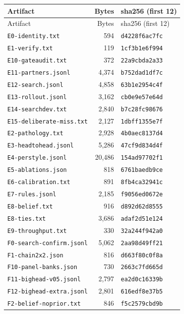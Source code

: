 \begin{longtable}{lrl}
\toprule
Artifact & Bytes & sha256 (first 12) \\
\midrule
\endfirsthead
\toprule
Artifact & Bytes & sha256 (first 12) \\
\midrule
\endhead
\texttt{E0-identity.txt} & 594 & \texttt{d4228f6ac7fc} \\
\texttt{E1-verify.txt} & 119 & \texttt{1cf3b1e6f994} \\
\texttt{E10-gateaudit.txt} & 372 & \texttt{22a9cbda2a33} \\
\texttt{E11-partners.jsonl} & 4,374 & \texttt{b752dad1df7c} \\
\texttt{E12-search.jsonl} & 4,858 & \texttt{63b1e2954c4f} \\
\texttt{E13-rollout.jsonl} & 3,162 & \texttt{cb0e9e57e64d} \\
\texttt{E14-searchdev.txt} & 2,840 & \texttt{b7c28fc98676} \\
\texttt{E15-deliberate-miss.txt} & 2,127 & \texttt{1dbff1355e7f} \\
\texttt{E2-pathology.txt} & 2,928 & \texttt{4b0aec8137d4} \\
\texttt{E3-headtohead.jsonl} & 5,286 & \texttt{47cf9d834d4f} \\
\texttt{E4-perstyle.jsonl} & 20,486 & \texttt{154ad97702f1} \\
\texttt{E5-ablations.json} & 818 & \texttt{6761baedb9ce} \\
\texttt{E6-calibration.txt} & 891 & \texttt{8fb4ca32941c} \\
\texttt{E7-rules.jsonl} & 2,185 & \texttt{f9056ed0672e} \\
\texttt{E8-belief.txt} & 916 & \texttt{d892d62d8555} \\
\texttt{E8-ties.txt} & 3,686 & \texttt{adaf2d51e124} \\
\texttt{E9-throughput.txt} & 330 & \texttt{32a244f942a0} \\
\texttt{F0-search-confirm.jsonl} & 5,062 & \texttt{2aa98d49ff21} \\
\texttt{F1-chain2x2.json} & 816 & \texttt{d663f80c0f8a} \\
\texttt{F10-panel-banks.json} & 730 & \texttt{2663c7fd665d} \\
\texttt{F11-bighead-v05.jsonl} & 2,797 & \texttt{ea2d0c16339b} \\
\texttt{F12-bighead-extra.jsonl} & 2,801 & \texttt{616edf8e37b5} \\
\texttt{F2-belief-noprior.txt} & 846 & \texttt{f5c2579cbd9b} \\

\end{longtable}
